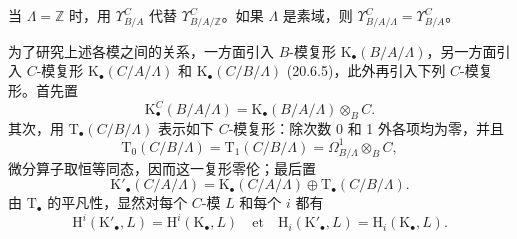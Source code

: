 \begin{env}[20.6.14]
当 $\Lambda=\mathbb{Z}$ 时，用 $\Upsilon^C_{B/A}$ 代替
$\Upsilon^C_{B/A/\mathbb{Z}}$。如果 $\Lambda$ 是素域，则
$\Upsilon^C_{B/A/\Lambda}=\Upsilon^C_{B/A}$。
\end{env}

\begin{env}[20.6.15]
\label{0.20.6.15-fr}
为了研究上述各模之间的关系，一方面引入 $B$-模复形
$\mathrm{K}_\bullet(B/A/\Lambda)$，另一方面引入 $C$-模复形
$\mathrm{K}_\bullet(C/A/\Lambda)$ 和 $\mathrm{K}_\bullet(C/B/\Lambda)$
(20.6.5)，此外再引入下列 $C$-模复形。首先置
\begin{equation}
\tag{20.6.15.1}
\label{0.20.6.15.1-fr}
  \mathrm{K}^C_\bullet(B/A/\Lambda)=
  \mathrm{K}_\bullet(B/A/\Lambda)\otimes_B C.
\end{equation}
其次，用 $\mathrm{T}_\bullet(C/B/\Lambda)$ 表示如下 $C$-模复形：除次数 0
和 1 外各项均为零，并且
\begin{equation}
\tag{20.6.15.2}
\label{0.20.6.15.2-fr}
  \mathrm{T}_0(C/B/\Lambda)=\mathrm{T}_1(C/B/\Lambda)=
  \Omega^1_{B/\Lambda}\otimes_B C,
\end{equation}
微分算子取恒等同态，因而这一复形零伦；最后置
\begin{equation}
\tag{20.6.15.3}
\label{0.20.6.15.3-fr}
  \mathrm{K}'_\bullet(C/A/\Lambda)=
  \mathrm{K}_\bullet(C/A/\Lambda)\oplus
  \mathrm{T}_\bullet(C/B/\Lambda).
\end{equation}
由 $\mathrm{T}_\bullet$ 的平凡性，显然对每个 $C$-模 $L$ 和每个 $i$ 都有
\begin{equation}
\tag{20.6.15.4}
\label{0.20.6.15.4-fr}
  \mathrm{H}^i(\mathrm{K}'_\bullet,L)=
  \mathrm{H}^i(\mathrm{K}_\bullet,L)
  \quad\text{et}\quad
  \mathrm{H}_i(\mathrm{K}'_\bullet,L)=
  \mathrm{H}_i(\mathrm{K}_\bullet,L).
\end{equation}
\end{env}
